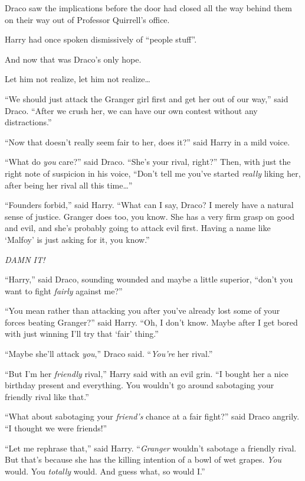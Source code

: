 \later

Draco saw the implications before the door had closed all the way behind them on their way out of Professor Quirrell’s office.

Harry had once spoken dismissively of “people stuff”.

And now that was Draco’s only hope.

Let him not realize, let him not realize…

“We should just attack the Granger girl first and get her out of our way,” said Draco.
“After we crush her, we can have our own contest without any distractions.”

“Now that doesn’t really seem fair to her, does it?” said Harry in a mild voice.

“What do \emph{you} care?” said Draco.
“She’s your rival, right?” Then, with just the right note of suspicion in his voice,
“Don’t tell me you’ve started \emph{really} liking her, after being her rival all this time…”

“Founders forbid,” said Harry.
“What can I say, Draco? I merely have a natural sense of justice. Granger does too, you know. She has a very firm grasp on good and evil, and she’s probably going to attack evil first. Having a name like ‘Malfoy’ is just asking for it, you know.”

\emph{DAMN IT!}

“Harry,” said Draco, sounding wounded and maybe a little superior, “don’t you want to fight \emph{fairly} against me?”

“You mean rather than attacking you after you’ve already lost some of your forces beating Granger?” said Harry.
“Oh, I don’t know. Maybe after I get bored with just winning I’ll try that ‘fair’ thing.”

“Maybe she’ll attack \emph{you},” Draco said. “\emph{You’re} her rival.”

“But I’m her \emph{friendly} rival,” Harry said with an evil grin.
“I bought her a nice birthday present and everything. You wouldn’t go around sabotaging your friendly rival like that.”

“What about sabotaging your \emph{friend’s} chance at a fair fight?” said Draco angrily.
“I thought we were friends!”

“Let me rephrase that,” said Harry. “\emph{Granger} wouldn’t sabotage a friendly rival. But that’s because she has the killing intention of a bowl of wet grapes. \emph{You} would. You \emph{totally} would. And guess what, so would I.”

